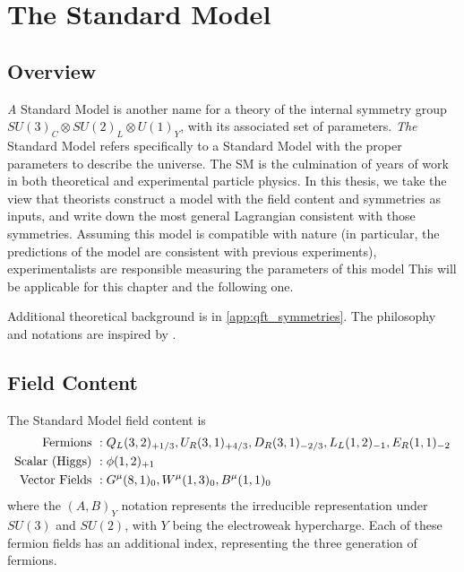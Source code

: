 \chapter{The Standard Model}\label{ch:sm}

\section{Overview}

\textit{A} Standard Model is another name for a theory of the internal symmetry group $SU(3)_C \otimes SU(2)_L \otimes U(1)_Y$, with its associated set of parameters.
\textit{The} Standard Model refers specifically to a Standard Model with the proper parameters to describe the universe.
The SM is the culmination of years of work in both theoretical and experimental particle physics.  
In this thesis, we take the view that theorists construct a model with the field content and symmetries as inputs, and write down the most general Lagrangian consistent with those symmetries.
Assuming this model is compatible with nature (in particular, the predictions of the model are consistent with previous experiments), experimentalists are responsible measuring the parameters of this model
This will be applicable for this chapter and the following one.

Additional theoretical background is in \ref{app:qft_symmetries}.
The philosophy and notations are inspired by \cite{yuvalSMLectures, Buchmuller:984122}.

\section{Field Content}\label{sec:field_content}

The Standard Model field content is
\begin{align}
\text{Fermions }       &:  Q_L(3,2)_{+1/3}, \xspace  U_R(3,1)_{+4/3},\xspace  D_R(3,1)_{-2/3} ,\xspace  L_L(1,2)_{-1} ,\xspace  E_R(1,1)_{-2} \notag \\
\text{Scalar (Higgs) } &:  \phi(1,2)_{+1} \\
\text{Vector Fields }  &:  G^\mu(8,1)_0 , \xspace W^\mu(1,3)_0 , \xspace B^\mu(1,1)_0 \notag
\end{align}
where the $(A, B)_Y$ notation represents the irreducible representation under $SU(3)$ and $SU(2)$, with $Y$ being the electroweak hypercharge.
Each of these fermion fields has an additional index, representing the three generation of fermions.

